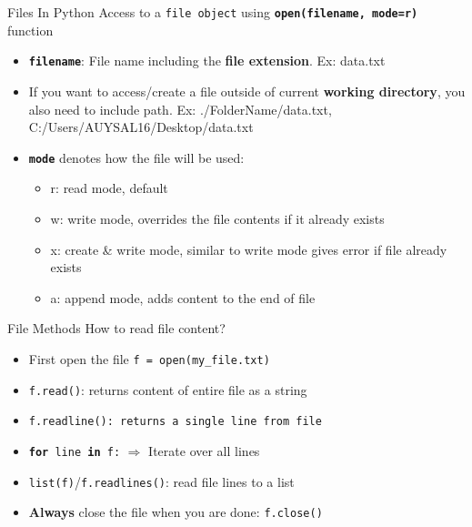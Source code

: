     \begin{frame}{Files In Python}
        \LARGE
        Access to a \texttt{file object} using \texttt{\textbf{open(filename, mode=\textquotesingle r\textquotesingle )}} function
        \begin{itemize}
            \Large
            \item \texttt{\textbf{filename}}: File name including the \textbf{file extension}. Ex: \textquotesingle data.txt\textquotesingle
            \pause
            \item If you want to access/create a file outside of current \textbf{working directory}, you also need to include path. Ex: \textquotesingle ./FolderName/data.txt\textquotesingle , \textquotesingle C:/Users/AUYSAL16/Desktop/data.txt\textquotesingle
            \pause
            \item \textbf{\texttt{mode}} denotes how the file will be used:
            \pause
            \begin{itemize}
                \large
                \item \textquotesingle r\textquotesingle : read mode, default
                \pause
                \item \textquotesingle w\textquotesingle : write mode, overrides the file contents if it already exists
                \pause
                \item \textquotesingle x\textquotesingle : create \& write mode, similar to write mode gives error if file already exists
                \pause
                \item \textquotesingle a\textquotesingle : append mode, adds content to the end of file
            \end{itemize}
        \end{itemize}
    \end{frame}

    \begin{frame}{File Methods}
        \LARGE
        How to read file content?
        \begin{itemize}
            \pause
            \item First open the file \texttt{f = open(\textquotesingle my\_file.txt\textquotesingle)}
            \pause
            \item \texttt{f.read()}: returns content of entire file as a string
            \pause
            \item \texttt{f.readline(): returns a single line from file}
            \pause
            \item \texttt{\textbf{for} line \textbf{in} f:} $\Rightarrow$ Iterate over all lines
            \pause
            \item \texttt{list(f)}/\texttt{f.readlines()}: read file lines to a list
            \pause
            \item \textbf{Always} close the file when you are done: \texttt{f.close()}
        \end{itemize}
    \end{frame}

